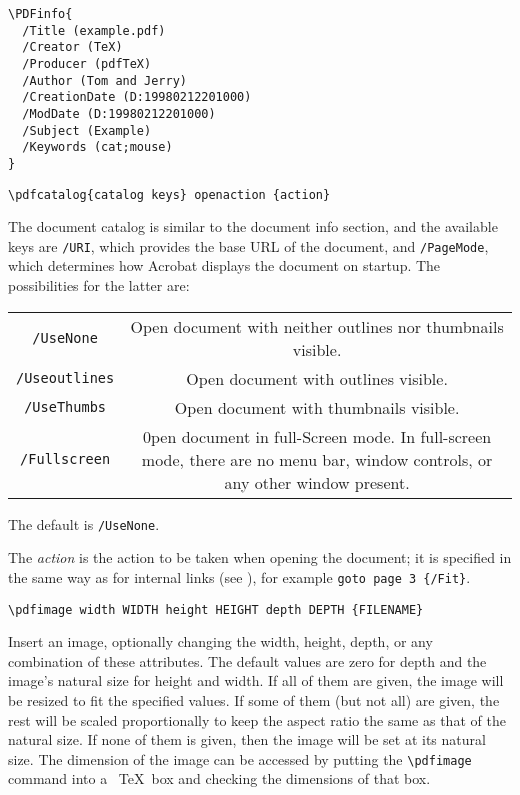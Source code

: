 \begin{verbatim}
\PDFinfo{ 
  /Title (example.pdf) 
  /Creator (TeX) 
  /Producer (pdfTeX) 
  /Author (Tom and Jerry) 
  /CreationDate (D:19980212201000) 
  /ModDate (D:19980212201000) 
  /Subject (Example) 
  /Keywords (cat;mouse) 
} 
\end{verbatim}

\begin{verbatim}
\pdfcatalog{catalog keys} openaction {action} 
\end{verbatim}

The document catalog is similar to the document info section, and the available 
keys are \verb|/URI|, which provides the base URL of the document, and \verb|/PageMode|, 
which determines how Acrobat displays the document on startup. The possibilities 
for the latter are: 

\begin{center}
  \begin{tabular}{cc}
    \verb|/UseNone|     & Open document with neither outlines nor thumbnails visible. \\
    \verb|/Useoutlines| & Open document with outlines visible.                        \\
    \verb|/UseThumbs|   & Open document with thumbnails visible.                      \\
    \verb|/Fullscreen|  & 0pen document in full-Screen mode. In full-screen mode,
    there are no menu bar, window controls, or any other window present.              \\
  \end{tabular}
\end{center}

The default is \verb|/UseNone|. 

The \emph{action} is the action to be taken when opening the document; it is specified in the same way as for internal links (see ), for example 
\verb|goto page 3 {/Fit}|. 


\begin{verbatim}
\pdfimage width WIDTH height HEIGHT depth DEPTH {FILENAME} 
\end{verbatim}

Insert an image, optionally changing the width, height, depth, or any combination 
of these attributes. The default values are zero for depth and the image’s natural 
size for height and width. If all of them are given, the image will be resized to fit 
the specified values. If some of them (but not all) are given, the rest will be scaled 
proportionally to keep the aspect ratio the same as that of the natural size. If none 
of them is given, then the image will be set at its natural size. The dimension of 
the image can be accessed by putting the \verb|\pdfimage| command into a \ \TeX\  box and 
checking the dimensions of that box. 

